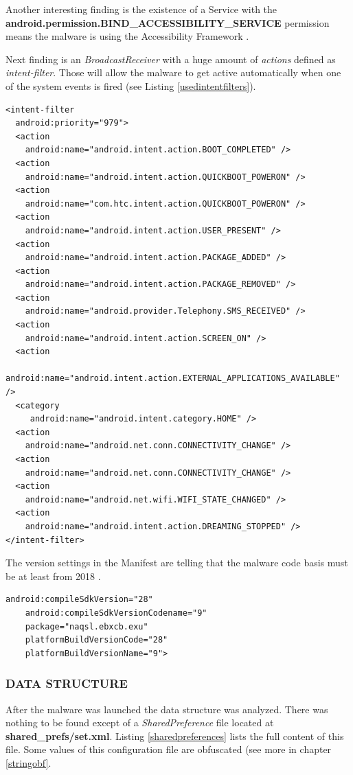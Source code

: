 \documentclass[10pt,titlepage]{article}
\begin{document}
Another interesting finding is the existence of a Service with the \textbf{android.permission.BIND\_ACCESSIBILITY\_SERVICE} permission means the malware is using the Accessibility Framework \cite[/guide/topics/ui/accessibility/service]{AndroidDev}.

Next finding is an \textit{BroadcastReceiver} with a huge amount of \textit{actions} defined as \textit{intent-filter}. Those will allow the malware to get active automatically when one of the system events is fired (see Listing \ref{usedintentfilters}).

\begin{lstlisting}[label=usedintentfilters,caption=Intent filter actions defined in the \textit{AndroidManifest.xml},frame=tb]
<intent-filter
  android:priority="979">
  <action
    android:name="android.intent.action.BOOT_COMPLETED" />
  <action
    android:name="android.intent.action.QUICKBOOT_POWERON" />
  <action
    android:name="com.htc.intent.action.QUICKBOOT_POWERON" />
  <action
    android:name="android.intent.action.USER_PRESENT" />
  <action
    android:name="android.intent.action.PACKAGE_ADDED" />
  <action
    android:name="android.intent.action.PACKAGE_REMOVED" />
  <action
    android:name="android.provider.Telephony.SMS_RECEIVED" />
  <action
    android:name="android.intent.action.SCREEN_ON" />
  <action
    android:name="android.intent.action.EXTERNAL_APPLICATIONS_AVAILABLE" />
  <category
     android:name="android.intent.category.HOME" />
  <action
    android:name="android.net.conn.CONNECTIVITY_CHANGE" />
  <action
    android:name="android.net.conn.CONNECTIVITY_CHANGE" />
  <action
    android:name="android.net.wifi.WIFI_STATE_CHANGED" />
  <action
    android:name="android.intent.action.DREAMING_STOPPED" />
</intent-filter>
\end{lstlisting}

The version settings in the Manifest are telling that the malware code basis must be at least from 2018 \cite[/studio/releases/platforms]{AndroidDev}.

\begin{lstlisting}[label=versionconfiguration,caption=Sdk version configuration defined in the \textit{AndroidManifest.xml},frame=tb]
    android:compileSdkVersion="28"
    android:compileSdkVersionCodename="9"
    package="naqsl.ebxcb.exu"
    platformBuildVersionCode="28"
    platformBuildVersionName="9">
\end{lstlisting}

\subsubsection{DATA STRUCTURE} \label{datastructure}
After the malware was launched the data structure was analyzed. There was nothing to be found except of a \textit{SharedPreference} file located at \textbf{shared\_prefs/set.xml}. Listing \ref{sharedpreferences} lists the full content of this file. Some values of this configuration file are obfuscated (see more in chapter \ref{stringobf}.
\end{document}
